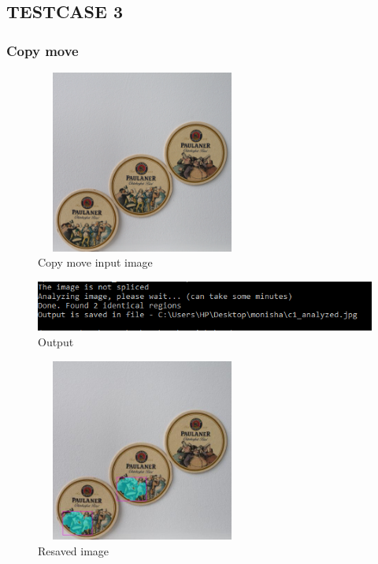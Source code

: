 \subsection{TESTCASE 3}
\subsubsection{Copy move}
\begin{figure}[htp]
\centering
\includegraphics[width=7cm,height=6cm]{Figures/c1.png}
\caption{Copy move input image}
\label{fig:lion}
\end{figure}
\begin{figure}[htp]
\centering
\includegraphics[width=15cm]{Figures/copycomd.PNG}
\caption{Output}
\label{fig:lion}
\end{figure}
\begin{figure}[htp]
\centering
\includegraphics[width=7cm,height=6cm]{Figures/c1_analyzed.jpg}
\caption{Resaved image}
\label{fig:lion}
\end{figure}

